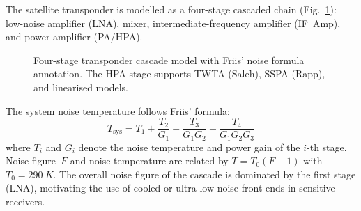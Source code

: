 \documentclass[telecom,article,submit,pdftex,moreauthors]{Definitions/mdpi}
\begin{document}
The satellite transponder is modelled as a four-stage cascaded chain
(Fig.~\ref{fig:transponder}): low-noise amplifier (LNA), mixer,
intermediate-frequency amplifier (IF~Amp), and power amplifier (PA/HPA).

\begin{figure}[!t]
\centering
{}
\caption{Four-stage transponder cascade model with Friis' noise
  formula annotation.  The HPA stage supports TWTA (Saleh), SSPA
  (Rapp), and linearised models.}
\label{fig:transponder}
\end{figure}

The system noise temperature follows Friis' formula:
\begin{equation}
  T_{\text{sys}} = T_1 + \frac{T_2}{G_1} + \frac{T_3}{G_1 G_2}
                 + \frac{T_4}{G_1 G_2 G_3}
  \label{eq:friis}
\end{equation}
where $T_i$ and $G_i$ denote the noise temperature and power gain of the
$i$-th stage.  Noise figure~$F$ and noise temperature are related by
$T = T_0(F - 1)$ with $T_0 = \SI{290}{K}$.  The overall noise
figure of the cascade is dominated by the first stage (LNA), motivating
the use of cooled or ultra-low-noise front-ends in sensitive receivers.
\end{document}
